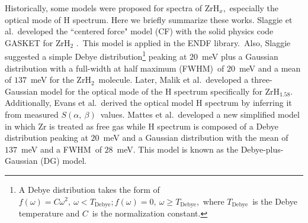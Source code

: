 \documentclass[review]{elsarticle}
\newcommand{\zh}{ZrH$_x$}
\newcommand{\tcb}[1]{{#1}}
\begin{document}

{Historically, some models were proposed for spectra of \zh,~especially the optical mode of H spectrum. Here we {briefly summarize these works}.
Slaggie et al.~developed the ``centered force" model (CF) with the solid physics code GASKET for ZrH$_2$ \cite{Slaggie}.~This model is applied in the ENDF library.~Also, Slaggie suggested a simple Debye distribution\footnote{\tcb{A Debye distribution takes the form of $f(\omega)=C\omega^2,\ \omega<T_\mathrm{Debye}; f(\omega)=0,\ \omega\geq T_\mathrm{Debye}$,\ where $T_\mathrm{Debye}$\ is the Debye temperature and $C$\ is the normalization constant.}} peaking at $20$~meV plus a Gaussian distribution with a full-width at half maximum (FWHM)~of $20$~meV and a mean of $137$~meV for the ZrH$_2$~molecule. Later, Malik et al.~developed a three-Gaussian model for the optical mode of the H spectrum specifically for ZrH$_{1.58}$. Additionally, Evans et al.~derived the optical model H spectrum by inferring it from  measured $S(\alpha,~\beta)$~values\cite{evans}. Mattes et al.~developed a new simplified model in which Zr is treated as free gas while H spectrum is composed of a Debye distribution peaking at $20$~meV and a Gaussian distribution with the mean of $137$~meV and a FWHM~of $28$~meV\cite{IKE}. This model is known as the Debye-plus-Gaussian (DG) model.}
\end{document}
